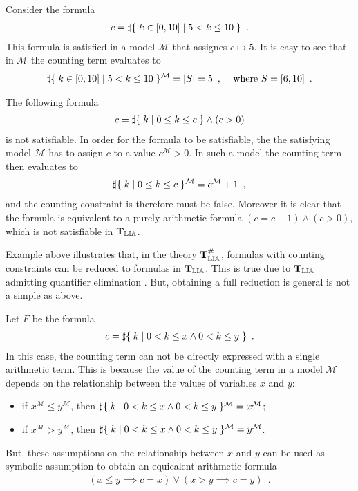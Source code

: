 \begin{example}
\label{ex:semantics}
Consider the formula
\begin{align*}
  c = \sharp\lbrace\;k \in [0, 10] \;|\;5 < k \le 10\;\rbrace\enspace.
\end{align*}
This formula is satisfied in a model $\mathcal{M}$ that assignes $c \mapsto 5$. It is
easy to see that in $\mathcal{M}$ the counting term evaluates to
\begin{align*}
  \sharp\lbrace\;k \in [0, 10] \;|\;5 < k \le 10\;\rbrace^\mathcal{M} = |S| = 5\enspace, &&
  \text{ where } S = [6, 10]\enspace.
\end{align*}
\end{example}

\begin{example}
\label{ex:simple}
The following formula
\begin{align*}
  c = \sharp\lbrace\;k\;|\;0 \le k \le c\;\rbrace \land (c > 0)
\end{align*}
is not satisfiable. In order for the formula to be satisfiable, the
the satisfying model $\mathcal{M}$ has to assign $c$ to a value
$c^\mathcal{M} > 0$. In such a model the counting term then evaluates to
\begin{align*}
  \sharp\lbrace\;k\;|\;0 \le k \le c\;\rbrace^\mathcal{M} = c^\mathcal{M} + 1\enspace,
\end{align*}
and the counting constraint is therefore must be false. Moreover it
is clear that the formula is equivalent to a purely arithmetic
formula $(c=c+1) \land (c>0)$, which is not satisfiable in $\operatorname{\mathbf{T}_{\mathbb{LIA}}}$.
\end{example}

Example above illustrates that, in the theory $\operatorname{\mathbf{T}^\#_{\mathbb{LIA}}}$, formulas with
counting constraints can be reduced to formulas in $\operatorname{\mathbf{T}_{\mathbb{LIA}}}$. This is
true due to $\operatorname{\mathbf{T}_{\mathbb{LIA}}}$ admitting quantifier elimination \cite{schweikardt}.
But, obtaining a full reduction is general is not a simple as above.

\begin{example}
\label{ex:disjunction}
Let  $F$ be the formula
\begin{align*}
  c = \sharp\lbrace\;k\;|\;0 < k \le x \land 0 < k \le y\;\rbrace\enspace.
\end{align*}
In this case, the counting term can not be directly expressed with a
single arithmetic term. This is because the value of the counting term
in a model $\mathcal{M}$ depends on the relationship between the values
of variables $x$ and $y$:
\begin{itemize}
  \item if $x^\mathcal{M} \le y^\mathcal{M}$, then $\sharp\lbrace\;k\;|\;0 < k \le x \land 0 < k \le y\;\rbrace^\mathcal{M} = x^\mathcal{M}$;
  \item if $x^\mathcal{M} > y^\mathcal{M}$, then $\sharp\lbrace\;k\;|\;0 < k \le x \land 0 < k \le y\;\rbrace^\mathcal{M} = y^\mathcal{M}$.
\end{itemize}
But, these assumptions on the relationship between $x$ and $y$ can
be used as symbolic assumption to obtain an equicalent arithmetic
formula
\begin{align*}
  (x \le y \implies c = x) \lor (x > y \implies c = y)\enspace.
\end{align*}
\end{example}

